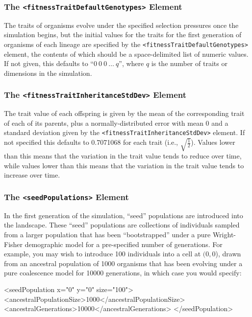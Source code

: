 \documentclass[11pt]{article}
\newcommand{\xmlelem}[1]{{\tt<\textcolor{xmlelem}{#1}>}}
\begin{document}
\subsubsection{The \xmlelem{fitnessTraitDefaultGenotypes} Element}

The traits of organisms evolve under the specified selection pressures once the simulation begins, but the initial values for the traits for the first generation of organisms of each lineage are specified by the \xmlelem{fitnessTraitDefaultGenotypes} element, the contents of which should be a space-delimited list of numeric values. 
If not given, this defaults to ``$0 \ 0 \ 0 \ \dots \ q$'', where $q$ is the number of traits or dimensions in the simulation.

\subsubsection{The \xmlelem{fitnessTraitInheritanceStdDev} Element}

The trait value of each offspring is given by the mean of the corresponding trait of each of its parents, plus a normally-distributed error with mean 0 and a standard deviation given by the \xmlelem{fitnessTraitInheritanceStdDev} element. 
If not specified this defaults to 0.7071068 for each trait (i.e., $\sqrt{\frac{1}{2}}$).
Values lower than this means that the variation in the trait value tends to reduce over time, while values lower than this means that the variation in the trait value tends to increase over time.

\subsubsection{The \xmlelem{seedPopulations} Element}

In the first generation of the simulation, ``seed'' populations are introduced into the landscape.
These ``seed'' populations are collections of individuals sampled from a larger population that has been ``bootstrapped'' under a pure Wright-Fisher demographic model for a pre-specified number of generations.
For example, you may wish to introduce 100 individuals into a cell at $(0,0$), drawn from an ancestral population of 1000 organisms that has been evolving under a pure coalescence model for 10000 generations, in which case you would specify:

\begin{ginkgoxml}
<seedPopulation x="0" y="0" size="100">
	<ancestralPopulationSize>1000</ancestralPopulationSize> 
	<ancestralGenerations>10000</ancestralGenerations>
</seedPopulation>
\end{ginkgoxml}
\end{document}
